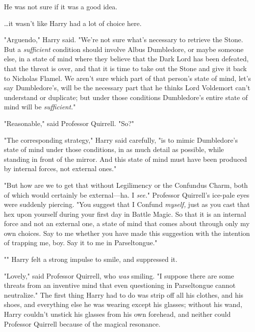 He was not sure if it was a good idea.

{\ldots}it wasn't like Harry had a lot of choice here.

"Arguendo," Harry said. "We're not sure what's necessary to retrieve the Stone. 
But a \emph{sufficient} condition should involve Albus Dumbledore, or maybe 
someone else, in a state of mind where they believe that the Dark Lord has been 
defeated, that the threat is over, and that it is time to take out the Stone 
and give it back to Nicholas Flamel. We aren't sure which part of that person's 
state of mind, let's say Dumbledore's, will be the necessary part that he 
thinks Lord Voldemort can't understand or duplicate; but under those conditions 
Dumbledore's entire state of mind will be \emph{sufficient.}"

"Reasonable," said Professor Quirrell. "So?"

"The corresponding strategy," Harry said carefully, "is to mimic Dumbledore's 
state of mind under those conditions, in as much detail as possible, while 
standing in front of the mirror. And this state of mind must have been produced 
by internal forces, not external ones."

"But how are we to get that without Legilimency or the Confundus Charm, both of 
which would certainly be external---ha. I \emph{see.}" Professor Quirrell's 
ice-pale eyes were suddenly piercing. "You suggest that I Confund 
\emph{myself,} just as you cast that hex upon yourself during your first day in 
Battle Magic. So that it is an internal force and not an external one, a state 
of mind that comes about through only my own choices. Say to me whether you 
have made this suggestion with the intention of trapping me, boy. Say it to me 
in Parseltongue."

"" Harry felt 
a strong impulse to smile, and suppressed it.

"Lovely," said Professor Quirrell, who \emph{was} smiling. "I suppose there are 
some threats from an inventive mind that even questioning in Parseltongue 
cannot neutralize."
\sbreak
The first thing Harry had to do was strip off all his clothes, and his shoes, 
and everything else he was wearing except his glasses; without his wand, Harry 
couldn't unstick his glasses from his own forehead, and neither could Professor 
Quirrell because of the magical resonance.

